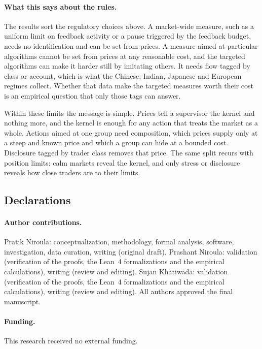 \documentclass[12pt]{article}
\theoremstyle{definition}
\theoremstyle{remark}
\begin{document}
\paragraph{What this says about the rules.} The results sort the regulatory choices above. A market-wide measure, such as a uniform limit on feedback activity or a pause triggered by the feedback budget, needs no identification and can be set from prices. A measure aimed at particular algorithms cannot be set from prices at any reasonable cost, and the targeted algorithms can make it harder still by imitating others. It needs flow tagged by class or account, which is what the Chinese, Indian, Japanese and European regimes collect. Whether that data make the targeted measures worth their cost is an empirical question that only those tags can answer.

Within these limits the message is simple. Prices tell a supervisor the kernel and nothing more, and the kernel is enough for any action that treats the market as a whole. Actions aimed at one group need composition, which prices supply only at a steep and known price and which a group can hide at a bounded cost. Disclosure tagged by trader class removes that price. The same split recurs with position limits: calm markets reveal the kernel, and only stress or disclosure reveals how close traders are to their limits.

\subsection*{Declarations}

\paragraph{Author contributions.} Pratik Niroula: conceptualization, methodology, formal analysis, software, investigation, data curation, writing (original draft). Prashant Niroula: validation (verification of the proofs, the Lean~4 formalizations and the empirical calculations), writing (review and editing). Sujan Khatiwada: validation (verification of the proofs, the Lean~4 formalizations and the empirical calculations), writing (review and editing). All authors approved the final manuscript.

\paragraph{Funding.} This research received no external funding.
\end{document}
